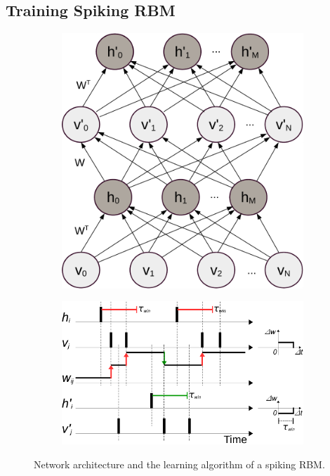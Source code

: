 \subsection{Training Spiking RBM}
\DIFaddbegin \label{subsec:exp_SRBM}
\DIFaddend \begin{figure}[h]
	\centering
		\begin{subfigure}[c]{0.33\textwidth}
			\includegraphics[width=\textwidth]{pics_sdlm/rbm.pdf}
		\end{subfigure}
		\begin{subfigure}[c]{0.66\textwidth}
			\includegraphics[width=\textwidth]{pics_sdlm/rSTDP_rbm.pdf}
		\end{subfigure}
	\caption{Network architecture and the learning algorithm of a spiking RBM.}
	\label{fig:sRBM}
\end{figure}

